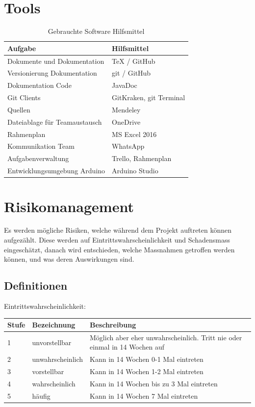 \documentclass[a4paper]{scrreprt}
\begin{document}
\section{Tools}
\label{sec:Tools}
\begin{table}[h!]
	\begin{tabular}{|p{}|p{}|}
		\hline
		\textbf{Aufgabe} & \textbf{Hilfsmittel} \\
		\hline
		Dokumente und Dokumentation & TeX / GitHub \\
		\hline
		Versionierung Dokumentation & git / GitHub\\
		\hline
		Dokumentation Code & JavaDoc \\
		\hline
		Git Clients & GitKraken, git Terminal\\
		\hline
		Quellen & Mendeley \\
		\hline
		Dateiablage für Teamaustausch & OneDrive \\
		\hline
		Rahmenplan & MS Excel 2016 \\
		\hline
		Kommunikation Team & WhatsApp\\
		\hline
		Aufgabenverwaltung & Trello, Rahmenplan\\
		\hline
		Entwicklungsumgebung Arduino & Arduino Studio\\
		\hline
	\end{tabular}
	\caption{Gebrauchte Software Hilfsmittel}
	\label{tab:SWTools}
\end{table}

\section{Risikomanagement}

Es werden mögliche Risiken, welche während dem Projekt auftreten können aufgezählt. Diese werden auf Eintrittswahrscheinlichkeit und Schadensmass eingeschätzt, danach wird entschieden, welche Massnahmen getroffen werden können, und was deren Auswirkungen sind.

\subsection{Definitionen}
\label{sssec:Def}
\vspace{1em}
\noindent
Eintrittswahrscheinlichkeit:

\vspace{1em}
\noindent
\begin{tabular}{|p{}|p{}|p{}|}
	\hline
	\textbf{Stufe} & \textbf{Bezeichnung} & \textbf{Beschreibung} \\
	\hline
	1 & unvorstellbar & Möglich aber eher unwahrscheinlich. Tritt nie oder einmal in 14 Wochen auf \\
	\hline
	2 & unwahrscheinlich & Kann in 14 Wochen 0-1 Mal eintreten\\
	\hline
	3 & vorstellbar & Kann in 14 Wochen 1-2 Mal eintreten \\
	\hline
	4 & wahrscheinlich & Kann in 14 Wochen bis zu 3 Mal eintreten \\
	\hline
	5 & häufig & Kann in 14 Wochen 7 Mal eintreten\\
	\hline
\end{tabular}
\end{document}
